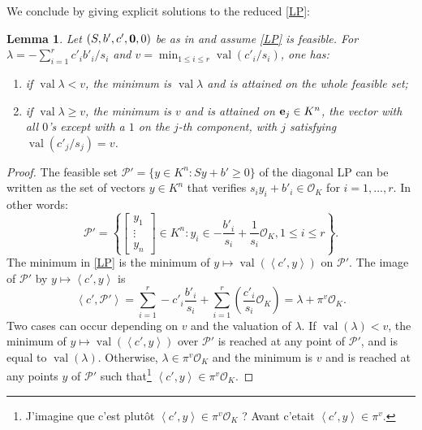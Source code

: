 \documentclass[a4paper,oneside,11pt]{article}
\newtheorem{lemma}[theorem]{Lemma}
\newcommand{\PP}{\mathcal{P}}
\newcommand{\simone}[1]{{\color{blue} #1}} %
\DeclareMathOperator{\val}{val}
\newcommand{\OK}{\mathcal{O}_K}
\begin{document}

We conclude by giving explicit solutions to the reduced \eqref{LP}:

\begin{lemma}\label{solutions}
  Let $(S,b',c',{\bf 0}, 0)$ be as in  and assume \eqref{LP} is feasible.
  For $\lambda = -\sum_{i=1}^r c'_i b'_i/s_i$ and $v = \min_{1\le i\le r} \val (c'_i/s_i)$,
  one has:
  \begin{enumerate}
  \item
    if $\val \lambda < v$, the minimum is $\val \lambda$ and is attained on the whole feasible
    set; \label{solutions:it1}
  \item
    if $\val \lambda \geq v$, the minimum is $v$ and is attained on
    ${\bf e}_j \in K^n$, the vector with all $0$'s except with a $1$ on the $j$-th component,
    with $j$ satisfying $\val (c'_j/s_j) = v$. \label{solutions:it2}
  \end{enumerate}
\end{lemma}
\begin{proof}
  The feasible set $\PP' = \{y \in K^n : Sy+b' \geq 0\}$ of the diagonal LP can be written
  as the set of vectors $y \in K^n$ that verifies $s_i y_i + b'_i \in \OK$ for $i=1,...,r$.
  In other words:
  $$
  \PP' = \left\{\left[\begin{smallmatrix} y_1\\ \vdots\\ y_n \end{smallmatrix}\right] \in K^n :
  y_i \in -\frac{b'_i}{s_i} + \frac{1}{s_i} \OK, 1\le i\le r\right\}.
  $$
  The minimum in \eqref{LP} is the minimum of
  $y \mapsto \val\left(\left\langle c',y \right\rangle\right)$ on $\PP'$.
  The image of $\PP'$ by $y \mapsto \left\langle c',y \right\rangle$ is
  \[
  \left\langle c',\PP' \right\rangle = \sum_{i=1}^r -c'_i \frac{b'_i}{s_i} + \sum_{i=1}^r\left( \frac{c'_i}{s_{i}} \OK \right) = \lambda + \pi^{v} \OK.
  \]
  Two cases can occur depending on $v$ and the valuation of $\lambda$.
  If $\val(\lambda) < v$, the minimum of $y\mapsto \val\left(\left\langle c',y \right\rangle\right)$ over $\PP'$ is reached at any point of $\PP'$, and is equal to $\val(\lambda)$.
  Otherwise, $\lambda \in \pi^{v} \OK$ and the minimum is $v$ and is reached at any points $y$ of $\PP'$ such that\footnote{\simone{J'imagine que c'est plutôt
    $\left<c',y \right> \in \pi^v\OK$ ? Avant c'etait $\left<c',y \right> \in \pi^v$.}}
  $\left<c',y \right> \in \pi^v\OK$.
\end{proof}
\end{document}
